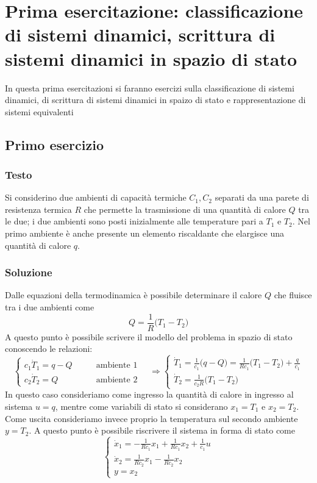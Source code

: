 \section{Prima esercitazione: classificazione di sistemi dinamici, scrittura di sistemi dinamici in spazio di stato}
	
	In questa prima esercitazioni si faranno esercizi sulla classificazione di sistemi dinamici, di scrittura di sistemi dinamici in spaizo di stato e rappresentazione di sistemi equivalenti

\subsection*{Primo esercizio}
	\subsubsection{Testo}
		Si considerino due ambienti di capacità termiche $C_1,C_2$ separati da una parete di resistenza termica $R$ che permette la trasmissione di una quantità di calore $Q$ tra le due; i due ambienti sono posti inizialmente alle temperature pari a $T_1$ e $T_2$. Nel primo ambiente è anche presente un elemento riscaldante che elargisce una quantità di calore $q$. 
		\begin{center}
		\end{center}
		
	\subsubsection{Soluzione}
		Dalle equazioni della termodinamica è possibile determinare il calore $Q$ che fluisce tra i due ambienti come
		\[Q = \frac 1 R \big(T_1-T_2\big) \]
		A questo punto è possibile scrivere il modello del problema in spazio di stato conoscendo le relazioni:
		\[ \begin{cases}
			c_1\dot T_1 = q- Q \qquad & \textrm{ambiente 1} \\ c_2 \dot T_2 = Q & \textrm{ambiente 2}
		\end{cases} \quad \Rightarrow \begin{cases}
			\dot T_1 = \frac 1 {c_1} \big(q-Q\big) =  \frac 1{Rc_1}\big(T_1-T_2\big) + \frac q {c_1} \\
			\dot T_2 = \frac 1 {c_2R} \big(T_1-T_2\big)
		\end{cases}\]
		In questo caso consideriamo come ingresso la quantità di calore in ingresso al sistema $u=q$, mentre come variabili di stato si considerano $x_1 = T_1$ e $x_2 = T_2$. Come uscita consideriamo invece proprio la temperatura sul secondo ambiente $y=T_2$. A questo punto è possibile riscrivere il sistema in forma di stato come
		\[ \begin{cases}
			\dot x_1 = - \frac 1 {Rc_1} x_1 + \frac 1 {Rc_1}x_2 + \frac 1{ c_1} u \\
			\dot x_2 = \frac 1 {Rc_2} x_1 - \frac 1 {Rc_2}x_2 \\ 
			y=x_2
		\end{cases}\]
		
